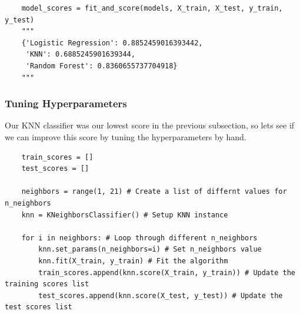 \documentclass[11pt, a4paper]{article}
\begin{document}
\begin{spacing}{1.1}
\begin{lstlisting}
	model_scores = fit_and_score(models, X_train, X_test, y_train, y_test)
	"""
	{'Logistic Regression': 0.8852459016393442,
	 'KNN': 0.6885245901639344,
	 'Random Forest': 0.8360655737704918}
	"""	\end{lstlisting} \vspace*{1mm}
	\subsubsection{Tuning Hyperparameters}
	Our KNN classifier was our lowest score in the previous subsection, so lets see if we can improve this score by tuning the hyperparameters by hand.
	\begin{lstlisting}
	train_scores = []
	test_scores = []
	
	neighbors = range(1, 21) # Create a list of differnt values for n_neighbors
	knn = KNeighborsClassifier() # Setup KNN instance
	
	for i in neighbors: # Loop through different n_neighbors
		knn.set_params(n_neighbors=i) # Set n_neighbors value
		knn.fit(X_train, y_train) # Fit the algorithm
		train_scores.append(knn.score(X_train, y_train)) # Update the training scores list
		test_scores.append(knn.score(X_test, y_test)) # Update the test scores list
	

\end{lstlisting}
\end{spacing}
\end{document}
